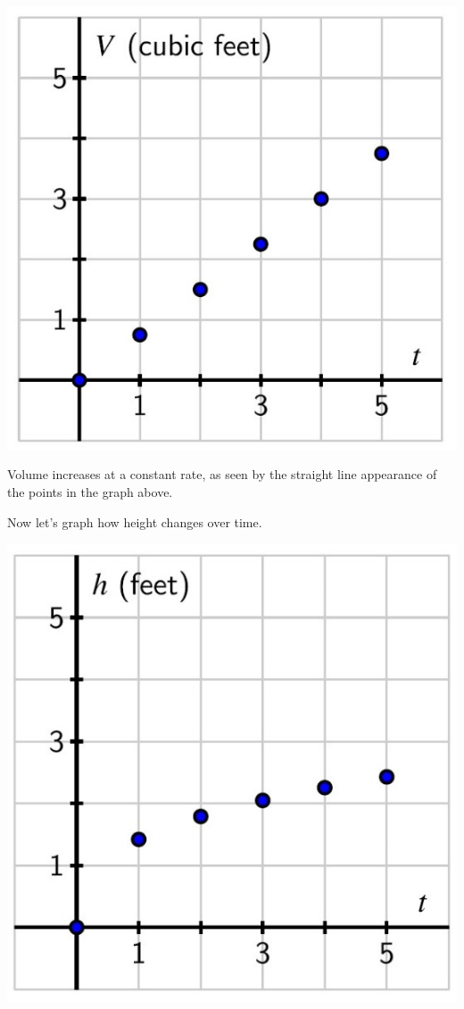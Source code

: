 \documentclass{ximera}
\begin{document}
\begin{image}
\includegraphics[width=\textwidth]{CiTtext7.jpg}
\end{image}

Volume increases at a constant rate, as seen by the straight line appearance of the points in the graph above.  

Now let's graph how height changes over time.

\begin{image}
\includegraphics[width=\textwidth]{CiTtext8.jpg}
\end{image}
\end{document}
